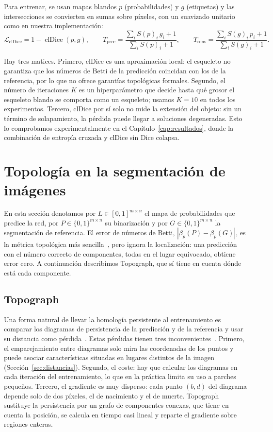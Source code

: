 Para entrenar, se usan mapas blandos $p$ (probabilidades) y $g$ (etiquetas)
y las intersecciones se convierten en sumas sobre píxeles, con un suavizado
unitario como en nuestra implementación:
\[
  \mathcal{L}_{\mathrm{clDice}}=1-\operatorname{clDice}(p,g),
  \qquad
  T_{\mathrm{prec}}=\frac{\sum_i S(p)_i\,g_i+1}{\sum_i S(p)_i+1},
  \qquad
  T_{\mathrm{sens}}=\frac{\sum_i S(g)_i\,p_i+1}{\sum_i S(g)_i+1}.
\]

Hay tres matices. Primero, clDice es una aproximación local: el esqueleto
no garantiza que los números de Betti de la predicción coincidan con los de
la referencia, por lo que no ofrece garantías topológicas formales. Segundo,
el número de iteraciones $K$ es un hiperparámetro que decide hasta qué
grosor el esqueleto blando se comporta como un esqueleto; usamos $K=10$ en
todos los experimentos. Tercero, clDice por sí solo no mide la extensión del
objeto: sin un término de solapamiento, la pérdida puede llegar a soluciones
degeneradas. Esto lo comprobamos experimentalmente en el Capítulo~\ref{cap:resultados}, donde la combinación de entropía cruzada y clDice sin Dice colapsa.

\section{Topología en la segmentación de imágenes}
\label{sec:topo-segmentacion}

En esta sección denotamos por $L\in[0,1]^{m\times n}$ el mapa de
probabilidades que predice la red, por $P\in\{0,1\}^{m\times n}$ su
binarización y por $G\in\{0,1\}^{m\times n}$ la segmentación de referencia.
El error de números de Betti, $|\beta_p(P)-\beta_p(G)|$, es la métrica
topológica más sencilla~\cite[App.~K]{stucki2023}, pero ignora la
localización: una predicción con el número correcto de componentes, todas
en el lugar equivocado, obtiene error cero. A continuación describimos
Topograph, que sí tiene en cuenta dónde está cada componente.

\subsection{Topograph}
\label{sec:topograph}

Una forma natural de llevar la homología persistente al entrenamiento es
comparar los diagramas de persistencia de la predicción y de la
referencia y usar su distancia como pérdida~\cite{hu2019,stucki2023}.
Estas pérdidas tienen tres inconvenientes~\cite{lux2025}. Primero, el
emparejamiento entre diagramas solo mira las coordenadas de los puntos y
puede asociar características situadas en lugares distintos de la imagen
(Sección~\ref{sec:distancias}). Segundo, el coste: hay que calcular los
diagramas en cada iteración del entrenamiento, lo que en la práctica
limita su uso a parches pequeños. Tercero, el gradiente es muy disperso:
cada punto $(b,d)$ del diagrama depende solo de dos píxeles, el de
nacimiento y el de muerte. Topograph~\cite{lux2025} sustituye la
persistencia por un grafo de componentes conexas, que tiene en cuenta la
posición, se calcula en tiempo casi lineal y reparte el gradiente sobre
regiones enteras.

